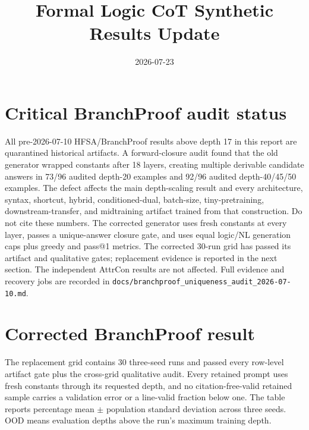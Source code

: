 \documentclass[10pt]{article}
\title{Formal Logic CoT Synthetic Results Update}
\date{2026-07-23}
\begin{document}
\maketitle

\section{Critical BranchProof audit status}
All pre-2026-07-10 HFSA/BranchProof results above depth 17 in this report are
quarantined historical artifacts. A forward-closure audit found that the old
generator wrapped constants after 18 layers, creating multiple derivable
candidate answers in 73/96 audited depth-20 examples and 92/96 audited
depth-40/45/50 examples. The defect affects the main depth-scaling result and
every architecture, syntax, shortcut, hybrid, conditioned-dual, batch-size,
tiny-pretraining, downstream-transfer, and midtraining artifact trained from
that construction. Do not cite these numbers. The corrected generator uses
fresh constants at every layer, passes a unique-answer closure gate, and uses
equal logic/NL generation caps plus greedy and pass@1 metrics.
The corrected 30-run grid has passed its artifact and qualitative gates; replacement evidence is reported in the next section. The independent AttrCon results are not affected.
Full evidence and recovery jobs are recorded in
\texttt{docs/branchproof\_uniqueness\_audit\_2026-07-10.md}.


\section{Corrected BranchProof result}
The replacement grid contains 30 three-seed runs and passed every row-level artifact gate plus
the cross-grid qualitative audit. Every retained prompt uses fresh constants through its requested
depth, and no citation-free-valid retained sample carries a validation error or a line-valid
fraction below one. The table reports percentage mean $\pm$ population standard deviation across
three seeds. OOD means evaluation depths above the run's maximum training depth.
\end{document}
